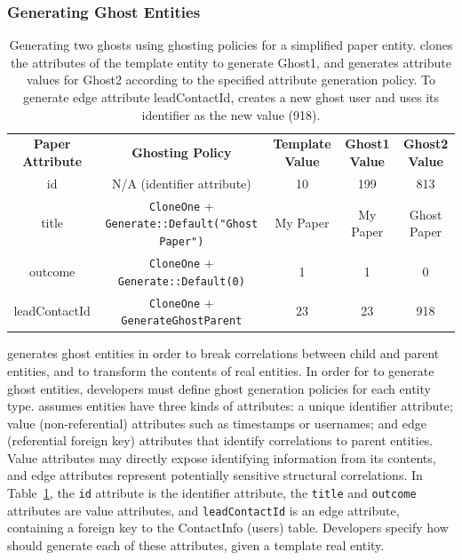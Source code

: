 \subsubsection{Generating Ghost Entities}
\label{sec:ghosting}

\begin{table}[t!]
    \centering
    \footnotesize
\begin{tabular}{@{}ccccc@{}}
\textbf{Paper Attribute} & \textbf{Ghosting Policy} & \textbf{Template Value} & \textbf{Ghost1 Value} & \textbf{Ghost2 Value} 
  \\ \cmidrule(r){1-5}
    {id} & N/A (identifier attribute) & 10 & 199 & 813 \\
{title} & \texttt{CloneOne} + \texttt{Generate::Default("Ghost Paper")} & My Paper & My
    Paper & Ghost Paper \\
{outcome} & \texttt{CloneOne} + \texttt{Generate::Default(0)} & 1 & 1 & 0 \\
{leadContactId} & \texttt{CloneOne} + \texttt{GenerateGhostParent} & 23 & 23 & 918 \\
\end{tabular}
    \caption{Generating two ghosts using ghosting policies for a simplified paper entity.
    \sys clones the attributes of the template entity to generate Ghost1, and generates
    attribute values for Ghost2 according to the specified attribute generation policy. To generate edge attribute leadContactId, \sys creates a new ghost user and uses its identifier as the new value (918).}
    \label{tab:ghosting}
\end{table}

\sys generates ghost entities in order to break correlations between child and parent entities, and
to transform the contents of real entities. 
In order for \sys to generate ghost entities, developers must define ghost generation policies for
each entity type.  \sys assumes entities have three kinds of attributes: a unique identifier
attribute; value (non-referential) attributes such as timestamps or usernames; and edge (referential
foreign key) attributes that identify correlations to parent entities.  Value attributes may
directly expose identifying information from its contents, and edge attributes represent potentially
sensitive structural correlations. In Table~\ref{tab:ghosting}, the \texttt{id} attribute is the
identifier attribute, the \texttt{title} and \texttt{outcome} attributes are value attributes, and
\texttt{leadContactId} is an edge attribute, containing a foreign key to the ContactInfo (users)
table.
Developers specify how \sys should generate each of these
attributes, given a template real entity.

